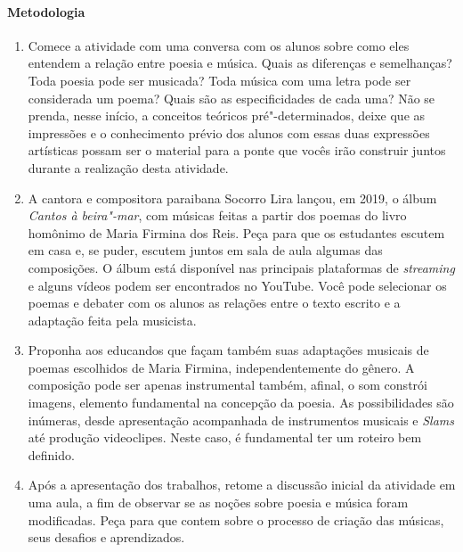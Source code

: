 \documentclass[12pt]{extarticle}
\begin{document}
\paragraph{Metodologia}
\begin{enumerate}
\item
Comece a atividade com uma conversa com os
alunos sobre como eles entendem a relação entre poesia e música. Quais
as diferenças e semelhanças? Toda poesia pode ser musicada? Toda música
com uma letra pode ser considerada um poema? Quais são as
especificidades de cada uma? Não se prenda, nesse início, a conceitos
teóricos pré"-determinados, deixe que as impressões e o conhecimento
prévio dos alunos com essas duas expressões artísticas possam ser o
material para a ponte que vocês irão construir juntos durante a
realização desta atividade.

\item
A cantora e compositora paraibana Socorro Lira lançou, em 2019, o
álbum \emph{Cantos à beira"-mar}, com músicas feitas a partir dos poemas
do livro homônimo de Maria Firmina dos Reis. Peça para que os estudantes
escutem em casa e, se puder, escutem juntos em sala de aula algumas das
composições. O álbum está disponível nas principais plataformas de
\textit{streaming} e alguns vídeos podem ser encontrados no YouTube. Você pode
selecionar os poemas e debater com os alunos as relações entre o texto
escrito e a adaptação feita pela musicista.




\item
Proponha aos educandos que façam também suas adaptações musicais de
poemas escolhidos de Maria Firmina, independentemente do gênero. A
composição pode ser apenas instrumental também, afinal, o som constrói
imagens, elemento fundamental na concepção da poesia. As possibilidades
são inúmeras, desde apresentação acompanhada de instrumentos musicais e
\emph{Slams} até produção videoclipes. Neste caso, é fundamental ter um
roteiro bem definido.

\item
Após a apresentação dos trabalhos, retome a discussão inicial da
atividade em uma aula, a fim de observar se as noções sobre poesia e
música foram modificadas. Peça para que contem sobre o processo de
criação das músicas, seus desafios e aprendizados.
\end{enumerate}
\end{document}
